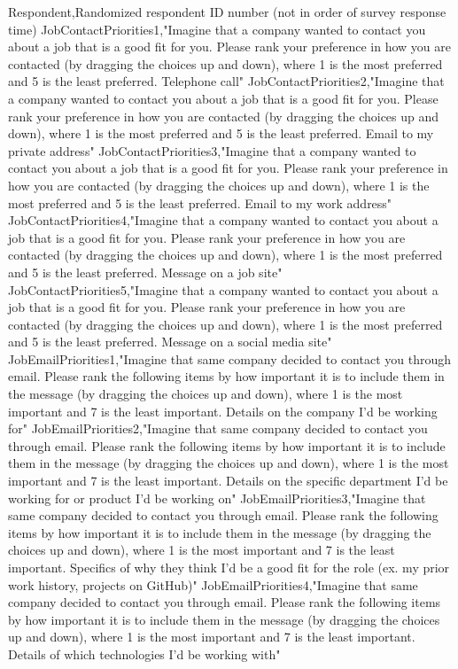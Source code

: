 \begin{appendices}
Respondent,Randomized respondent ID number (not in order of survey response time)
JobContactPriorities1,"Imagine that a company wanted to contact you about a job that is a good fit for you. Please rank your preference in how you are contacted (by dragging the choices up and down), where 1 is the most preferred and 5 is the least preferred. Telephone call"
JobContactPriorities2,"Imagine that a company wanted to contact you about a job that is a good fit for you. Please rank your preference in how you are contacted (by dragging the choices up and down), where 1 is the most preferred and 5 is the least preferred. Email to my private address"
JobContactPriorities3,"Imagine that a company wanted to contact you about a job that is a good fit for you. Please rank your preference in how you are contacted (by dragging the choices up and down), where 1 is the most preferred and 5 is the least preferred. Email to my work address"
JobContactPriorities4,"Imagine that a company wanted to contact you about a job that is a good fit for you. Please rank your preference in how you are contacted (by dragging the choices up and down), where 1 is the most preferred and 5 is the least preferred. Message on a job site"
JobContactPriorities5,"Imagine that a company wanted to contact you about a job that is a good fit for you. Please rank your preference in how you are contacted (by dragging the choices up and down), where 1 is the most preferred and 5 is the least preferred. Message on a social media site"
JobEmailPriorities1,"Imagine that same company decided to contact you through email. Please rank the following items by how important it is to include them in the message (by dragging the choices up and down), where 1 is the most important and 7 is the least important. Details on the company I'd be working for"
JobEmailPriorities2,"Imagine that same company decided to contact you through email. Please rank the following items by how important it is to include them in the message (by dragging the choices up and down), where 1 is the most important and 7 is the least important. Details on the specific department I'd be working for or product I'd be working on"
JobEmailPriorities3,"Imagine that same company decided to contact you through email. Please rank the following items by how important it is to include them in the message (by dragging the choices up and down), where 1 is the most important and 7 is the least important. Specifics of why they think I'd be a good fit for the role (ex. my prior work history, projects on GitHub)"
JobEmailPriorities4,"Imagine that same company decided to contact you through email. Please rank the following items by how important it is to include them in the message (by dragging the choices up and down), where 1 is the most important and 7 is the least important. Details of which technologies I'd be working with"

\end{appendices}
